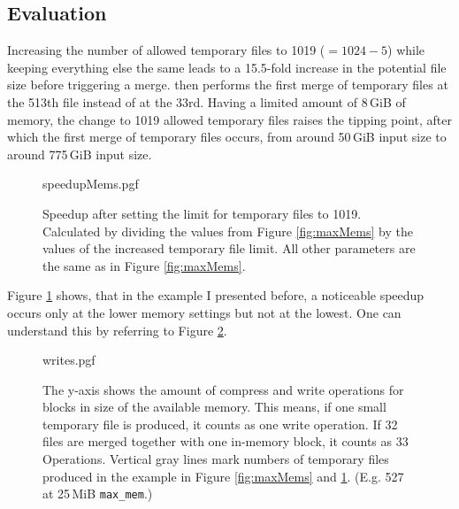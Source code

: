 \subsection{Evaluation}
Increasing the number of allowed temporary files to 1019 ($=1024-5$) while keeping everything else the same leads to a 15.5-fold increase in the potential file size before triggering a merge. \sort then performs the first merge of temporary files at the 513th file instead of at the 33rd. Having a limited amount of 8\,GiB of memory, the change to 1019 allowed temporary files raises the tipping point, after which the first merge of temporary files occurs, from around 50\,GiB input size to around 775\,GiB input size.
\begin{figure}
        {speedupMems.pgf}
    \caption{Speedup after setting the limit for temporary files to 1019. Calculated by dividing the values from Figure \ref{fig:maxMems} by the values of the increased temporary file limit. All other parameters are the same as in Figure \ref{fig:maxMems}.}
    \label{fig:memSpeedup}
\end{figure}
Figure \ref{fig:memSpeedup} shows, that in the example I presented before, a noticeable speedup occurs only at the lower memory settings but not at the lowest. One can understand this by referring to Figure \ref{fig:writes}.
\begin{figure}
        {writes.pgf}
    \caption{
    The y-axis shows the amount of compress and write operations for blocks in size of the available memory. This means, if one small temporary file is produced, it counts as one write operation. If 32 files are merged together with one in-memory block, it counts as 33 Operations. Vertical gray lines mark numbers of temporary files produced in the example in Figure \ref{fig:maxMems} and \ref{fig:memSpeedup}. (E.g. 527 at 25\,MiB \texttt{max\_mem}.)
    }
    \label{fig:writes}
\end{figure}

